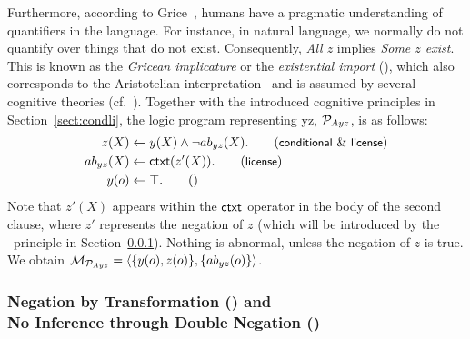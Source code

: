 \documentclass[12pt]{article}
\begin{document}
Furthermore, according to Grice~\cite{grice1975}, humans have a pragmatic understanding of quantifiers in the language.
For instance, in natural language, we normally do not quantify over things that do not exist.
Consequently, \textit{All $z$} implies \textit{Some $z$ exist}.
This is known as the \textit{Gricean implicature} or the \textit{existential import} (),
which also corresponds to the Aristotelian interpretation~\cite{parry:1991} and is assumed by several cognitive theories (cf.~\cite{johnsonlaird:1983,Rips1994}). 
Together with the introduced cognitive principles in Section~\ref{sect:condli}, the logic program representing \MA yz, ${\cal P}_{Ayz}$, is as follows:
\begin{align} %
z(X) & \leftarrow  y(X) \wedge \neg \Ab_{yz}(X). 
\tag{\conditionals\ \&\ \licenses} \\
\Ab_{yz}(X) & \leftarrow \cxt(z'(X)). \tag{\licenses}\\
y(o) & \leftarrow \top. \tag{}
\end{align}
Note that $z'(X)$ appears within the $\mathsf{ctxt}$ operator in the body of the second clause, where $z'$ represents the negation of $z$ (which will be introduced by the \transformation\ principle in Section~\ref{sect:dneg}).
Nothing is abnormal, unless the negation of $z$ is true.
We obtain \quad ${\cal M}_{{\cal P}_{Ayz}} = \langle \{y(o),z(o)\}, \{ab_{yz}(o)\} \rangle$.


\subsubsection{Negation by Transformation (\transformation) and \\No Inference through Double Negation (\dnegation)} \label{sect:dneg}
\end{document}
